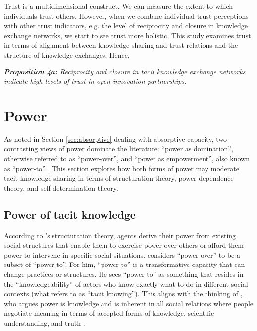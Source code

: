 Trust is a multidimensional construct. We can measure the extent to which individuals trust others. However, when we combine individual trust perceptions with other trust indicators, e.g. the level of reciprocity and closure in knowledge exchange networks, we start to see trust more holistic. This study examines trust in terms of alignment between knowledge sharing and trust relations and the structure of knowledge exchanges. Hence, \bigskip

\begin{tcolorbox}
\textit{\textbf{Proposition 4a:} Reciprocity and closure in tacit knowledge exchange networks indicate high levels of trust in open innovation partnerships.}
\end{tcolorbox}

\section{Power} \label{sec:power}

As noted in Section \ref{sec:absorptive} dealing with absorptive capacity, two contrasting views of power dominate the literature: \enquote{power as domination}, otherwise referred to as \enquote{power-over}, and \enquote{power as empowerment}, also known as \enquote{power-to} \citep{haugaard2012rethinking}. This section explores how both forms of power may moderate tacit knowledge sharing in terms of structuration theory, power-dependence theory, and self-determination theory. 

\subsection{Power of tacit knowledge}

According to \citeauthor{giddens1984constitution}'s \citeyearpar{giddens1984constitution} structuration theory, agents derive their power from existing social structures that enable them to exercise power over others or afford them power to intervene in specific social situations. \citet{giddens1984constitution} considers \enquote{power-over} to be a subset of \enquote{power to}. For him, \enquote{power-to} is a transformative capacity that can change practices or structures. He sees \enquote{power-to} as something that resides in the \enquote{knowledgeability} of actors who know exactly what to do in different social contexts (what \citet{polanyi1966logic} refers to as \enquote{tacit knowing}). This aligns with the thinking of \citet{foucault1980power}, who argues power is knowledge and is inherent in all social relations where people negotiate meaning in terms of accepted forms of knowledge, scientific understanding, and truth \citep{diamond1988foucault}.\medskip

